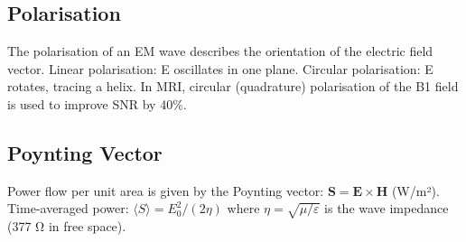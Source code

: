 				

\subsection{Polarisation}

				

The polarisation of an EM wave describes the orientation of the electric field vector. Linear polarisation: E oscillates in one plane. Circular polarisation: E rotates, tracing a helix. In MRI, circular (quadrature) polarisation of the B1 field is used to improve SNR by 40\%.

				

\subsection{Poynting Vector}

				

Power flow per unit area is given by the Poynting vector: $\mathbf{S} = \mathbf{E} \times \mathbf{H}$ (W/m²). Time-averaged power: $\langle S \rangle = E_0^2 / (2\eta)$ where $\eta = \sqrt{\mu/\varepsilon}$ is the wave impedance (377 Ω in free space).



